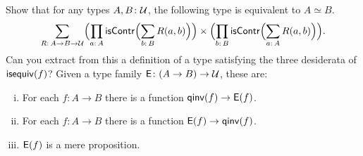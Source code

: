 \begin{exr}\fe
    Show that for any types\/ $A, B\colon\univ$, the following type is equivalent to\/ $A\simeq B$.
    \[
        \sum_{R\colon A\to B\to\univ}
        \Bigl(
            \prod_{a\colon A}
            \fun{isContr}\Bigl(\sum_{b\colon B}R(a,b)\Bigr)
        \Bigr)
        \times
        \Bigl(
            \prod_{b\colon B}
            \fun{isContr}\Bigl(\sum_{a\colon A}R(a,b)\Bigr)
        \Bigr).
    \]
    Can you extract from this a definition of a type satisfying the three desiderata of\/ $\mathsf{isequiv}(f)$? Given a type family $\fun E\colon(A\to B)\to\univ$, these are:
    \begin{enumerate}[i),font=\upshape]
        \item For each\/ $f\colon A\to B$ there is a function\/ $\mathsf{qinv}(f)\to\mathsf{E}(f)$.
        
        \item For each\/ $f\colon A\to B$ there is a function\/ $\mathsf{E}(f)\to\mathsf{qinv}(f)$.
        
        \item $\mathsf{E}(f)$ is a mere proposition.
    \end{enumerate}
\end{exr}

